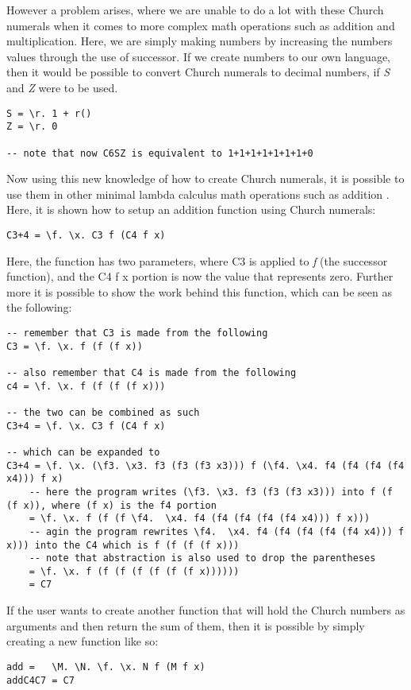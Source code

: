 \documentclass{article}
\begin{document}
However a problem arises, where we are unable to do a lot with these Church numerals when it comes to more complex math operations such as addition and multiplication.
Here, we are simply making numbers by increasing the numbers values through the use of successor.
If we create numbers to our own language, then it would be possible to convert Church numerals to decimal numbers, if \textit{S} and \textit{Z} were to be used.
\begin{lstlisting}
S = \r. 1 + r()
Z = \r. 0

-- note that now C6SZ is equivalent to 1+1+1+1+1+1+1+0
\end{lstlisting}
Now using this new knowledge of how to create Church numerals, it is possible to use them  in other minimal lambda calculus math operations such as addition \cite{13}.
Here, it is shown how to setup an addition function using Church numerals:
\begin{lstlisting}
C3+4 = \f. \x. C3 f (C4 f x)
\end{lstlisting}
Here, the function has two parameters, where C3 is applied to \textit{f} (the successor function), and the C4 f x portion is   now the value that represents zero.
Further more it is possible to show the work behind this function, which can be seen as the following:
\begin{lstlisting}
-- remember that C3 is made from the following
C3 = \f. \x. f (f (f x))

-- also remember that C4 is made from the following
c4 = \f. \x. f (f (f (f x)))

-- the two can be combined as such
C3+4 = \f. \x. C3 f (C4 f x)

-- which can be expanded to
C3+4 = \f. \x. (\f3. \x3. f3 (f3 (f3 x3))) f (\f4. \x4. f4 (f4 (f4 (f4 x4))) f x)
    -- here the program writes (\f3. \x3. f3 (f3 (f3 x3))) into f (f (f x)), where (f x) is the f4 portion
    = \f. \x. f (f (f \f4.  \x4. f4 (f4 (f4 (f4 (f4 x4))) f x)))
    -- agin the program rewrites \f4.  \x4. f4 (f4 (f4 (f4 (f4 x4))) f x))) into the C4 which is f (f (f (f x)))
    -- note that abstraction is also used to drop the parentheses
    = \f. \x. f (f (f (f (f (f (f x))))))
    = C7
\end{lstlisting}
If the user wants to create another function that will hold the Church numbers as arguments and then return the sum of them, then it is possible by simply creating a new function like so:
\begin{lstlisting}
add =   \M. \N. \f. \x. N f (M f x)
addC4C7 = C7
\end{lstlisting}
\end{document}

